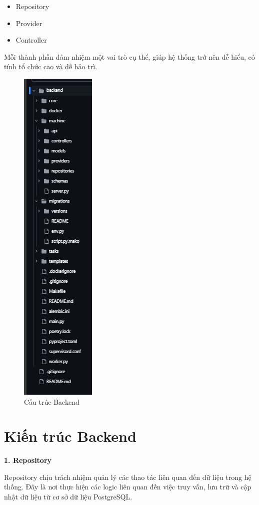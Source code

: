 \begin{itemize}
    \item Repository
    \item Provider
    \item Controller
\end{itemize}

Mỗi thành phần đảm nhiệm một vai trò cụ thể, giúp hệ thống trở nên dễ hiểu, có tính tổ chức cao và dễ bảo trì.

\begin{figure}[H]
    \centering
    \includegraphics[scale=0.5]{Images/Implement/backendStructure.png}
    \caption{Cấu trúc Backend}
\end{figure}

\section{Kiến trúc Backend}

\textbf{1. Repository} 

Repository chịu trách nhiệm quản lý các thao tác liên quan đến dữ liệu trong hệ thống. Đây là nơi thực hiện các logic liên quan đến việc truy vấn, lưu trữ và cập nhật dữ liệu từ cơ sở dữ liệu PostgreSQL.

